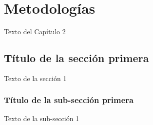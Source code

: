 
\chapter{Metodologías}

Texto del Capítulo 2

\section{Título de la sección primera}

Texto de la sección 1


\subsection{Título de la sub-sección primera}

Texto de la sub-sección 1

